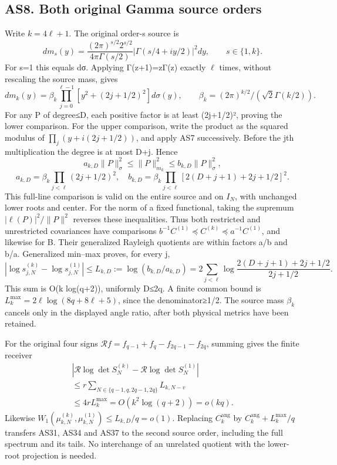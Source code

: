 \documentclass[11pt]{article}
\begin{document}
\subsection{AS8. Both original Gamma source orders}\label{as8.-both-original-gamma-source-orders}

Write \(k=4\ell+1\). The original order-s source is \[
dm_s(y)=\frac{(2\pi)^{s/2}2^{s/2}}{4\pi\Gamma(s/2)}
|\Gamma(s/4+iy/2)|^2dy,\qquad s\in\{1,k\}.
\] For s=1 this equals dσ. Applying Γ(z+1)=zΓ(z) exactly \(\ell\) times, without rescaling the source mass, gives \[
dm_k(y)=\beta_k\prod_{j=0}^{\ell-1}[y^2+(2j+1/2)^2]d\sigma(y),
\qquad\beta_k=(2\pi)^{k/2}/(\sqrt2\Gamma(k/2)).
\tag{AS44}
\] For any P of degree≤D, each positive factor is at least (2j+1/2)², proving the lower comparison. For the upper comparison, write the product as the squared modulus of \(\prod_j(y+i(2j+1/2))\), and apply AS7 successively. Before the jth multiplication the degree is at most D+j. Hence \[
a_{k,D}\|P\|_\sigma^2\le\|P\|_{m_k}^2\le b_{k,D}\|P\|_\sigma^2,
\] \[
a_{k,D}=\beta_k\prod_{j<\ell}(2j+1/2)^2,
\quad b_{k,D}=\beta_k\prod_{j<\ell}[2(D+j+1)+2j+1/2]^2.
\tag{AS45}
\] This full-line comparison is valid on the entire source and on \(I_N\), with unchanged lower roots and center. For the norm of a fixed functional, taking the supremum \(|\ell(P)|^2/\|P\|^2\) reverses these inequalities. Thus both restricted and unrestricted covariances have comparisons \(b^{-1}C^{(1)}\preceq C^{(k)}\preceq a^{-1}C^{(1)}\), and likewise for B. Their generalized Rayleigh quotients are within factors a/b and b/a. Generalized min--max proves, for every j, \[
|\log s_{j,N}^{(k)}-\log s_{j,N}^{(1)}|
\le L_{k,D}:=\log(b_{k,D}/a_{k,D})
=2\sum_{j<\ell}\log\frac{2(D+j+1)+2j+1/2}{2j+1/2}.
\tag{AS46}
\] This sum is O(k log(q+2)), uniformly D≤2q. A finite common bound is \(L_k^{\max}=2\ell\log(8q+8\ell+5)\), since the denominator≥1/2. The source mass \(\beta _k\) cancels only in the displayed angle ratio, after both physical metrics have been retained.

For the original four signs \(\mathcal Rf=f_{q-1}+f_q-f_{2q-1}-f_{2q}\), summing gives the finite receiver \[\begin{gathered}
|\mathcal R\log\det S_N^{(k)}-
\mathcal R\log\det S_N^{(1)}|
\\\le r\sum_{N\in\{q-1,q,2q-1,2q\}}L_{k,N-v}
\\\le4rL_k^{\max}=O(k^2\log(q+2))=o(kq).
\end{gathered}\tag{AS47}\] Likewise \(W_1(\mu^{(k)}_{k,N},\mu^{(1)}_{k,N})\le L_{k,D}/q=o(1)\). Replacing \(C_k^{\mathrm{ang}}\) by \(C_k^{\mathrm{ang}}+L_k^{\max}/q\) transfers AS31, AS34 and AS37 to the second source order, including the full spectrum and its tails. No interchange of an unrelated quotient with the lower-root projection is needed.
\end{document}
